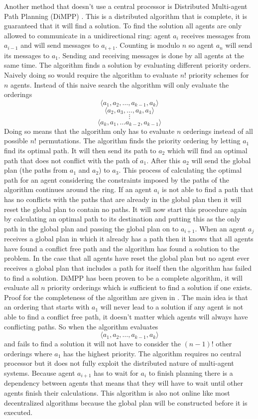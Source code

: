 Another method that doesn't use a central processor is Distributed Multi-agent
Path Planning (DiMPP) \cite{chouhan2017}. This is a distributed algorithm that
is complete, it is guaranteed that it will find a solution. To find the
solution all agents are only allowed to communicate in a unidirectional ring:
agent $a_i$ receives messages from $a_{i-1}$ and will send messages to
$a_{i+1}$. Counting is modulo $n$ so agent $a_n$ will send its messages to
$a_1$. Sending and receiving messages is done by all agents at the same time.
The algorithm finds a solution by evaluating different priority orders. Naively
doing so would require the algorithm to evaluate $n!$ priority schemes for $n$
agents. Instead of this naive search the algorithm will only evaluate the
orderings
\[ \langle a_1, a_2, \ldots, a_{k-1}, a_k \rangle \]
\[ \langle a_2, a_3, \ldots, a_k, a_1 \rangle \]
\[ \vdots \]
\[ \langle a_k, a_1, \ldots a_{k-2}, a_{k-1} \rangle \]
Doing so means that the algorithm only has to evaluate $n$ orderings instead of
all possible $n!$ permutations. The algorithm finds the priority ordering
by letting $a_1$ find its optimal path. It will then send its path to $a_2$
which will find an optimal path that does not conflict with the path of $a_1$.
After this $a_2$ will send the global plan (the paths from $a_1$ and $a_2$) to
$a_3$. This process of calculating the optimal path for an agent considering
the constraints imposed by the paths of the algorithm continues around the
ring. If an agent $a_i$ is not able to find a path that has no conflicts with
the paths that are already in the global plan then it will reset the global
plan to contain no
paths. It will now start this procedure again by calculating an optimal path to
its destination and putting this as the only path in the global plan and
passing the global plan on to $a_{i+1}$. When an agent $a_j$ receives a global
plan in which it already has a path then it knows that all agents have found a
conflict free path and the algorithm has found a solution to the problem. In
the case that all agents have reset the global plan but no agent ever receives
a global plan that includes a path for itself then the algorithm has failed to
find a solution. DiMPP has been proven to be a complete algorithm, it will
evaluate all $n$ priority orderings which is sufficient to find a solution if
one exists. Proof for the completeness of the algorithm are given in
\cite[subsection 5.1]{chouhan2017}. The main idea is that an ordering that
starts with $a_1$ will never lead to a solution if any agent is not able to
find a conflict free path, it doesn't matter which agents will always have
conflicting paths. So when the algorithm evaluates
\[ \langle a_1, a_2, \ldots, a_{k-1}, a_k \rangle \]
and fails to find a solution it will not have to
consider the $(n-1)!$ other orderings where $a_1$ has the highest priority. The
algorithm requires no central processor but it does not fully exploit the
distributed nature of multi-agent systems. Because agent $a_{i+1}$ has
to wait for
$a_i$ to finish planning there is a dependency between agents that means that
they will have to wait until other agents finish their calculations. This
algorithm is also not online like most decentralized algorithms because the
global plan will be constructed before it is executed.

